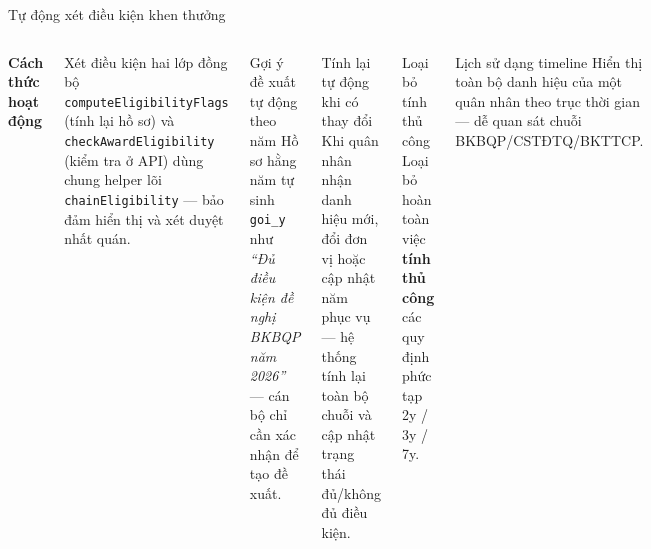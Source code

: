 \documentclass[aspectratio=43,xcolor=table]{beamer}
\begin{document}
\begin{frame}{Tự động xét điều kiện khen thưởng}
  \begin{columns}[T,onlytextwidth]
    \textbf{Cách thức hoạt động}\\[0.2cm]

    \begin{block}{Xét điều kiện hai lớp đồng bộ}
      \scriptsize \texttt{computeEligibilityFlags} (tính lại hồ sơ) và \texttt{checkAwardEligibility} (kiểm tra ở API) dùng chung helper lõi \texttt{chainEligibility} --- bảo đảm hiển thị và xét duyệt nhất quán.
    \end{block}

    \begin{block}{Gợi ý đề xuất tự động theo năm}
      \scriptsize Hồ sơ hằng năm tự sinh \texttt{goi\_y} như \textit{``Đủ điều kiện đề nghị BKBQP năm 2026''} --- cán bộ chỉ cần xác nhận để tạo đề xuất.
    \end{block}

    \begin{block}{Tính lại tự động khi có thay đổi}
      \scriptsize Khi quân nhân nhận danh hiệu mới, đổi đơn vị hoặc cập nhật năm phục vụ --- hệ thống tính lại toàn bộ chuỗi và cập nhật trạng thái đủ/không đủ điều kiện.
    \end{block}

    \begin{block}{Loại bỏ tính thủ công}
      \scriptsize \centering Loại bỏ hoàn toàn việc \textbf{tính thủ công} các quy định phức tạp 2y / 3y / 7y.
    \end{block}

    \begin{block}{Lịch sử dạng timeline}
      \scriptsize Hiển thị toàn bộ danh hiệu của một quân nhân theo trục thời gian --- dễ quan sát chuỗi BKBQP/CSTĐTQ/BKTTCP.
    \end{block}
  \end{columns}
\end{frame}
\end{document}
